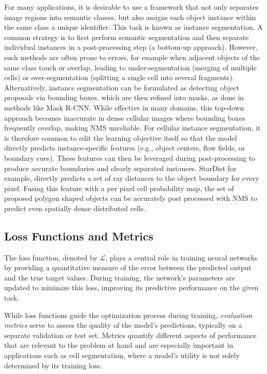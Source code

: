 For many applications, it is desirable to use a framework that not only separates image regions into semantic classes, but also assigns each object instance within the same class a unique identifier. This task is known as instance segmentation.
A common strategy is to first perform semantic segmentation and then separate individual instances in a post-processing step (a bottom-up approach). However, such methods are often prone to errors, for example when adjacent objects of the same class touch or overlap, leading to under-segmentation (merging of multiple cells) or over-segmentation (splitting a single cell into several fragments).
Alternatively, instance segmentation can be formulated as detecting object proposals via bounding boxes, which are then refined into masks, as done in methods like Mask R-CNN. While effective in many domains, this top-down approach becomes inaccurate in dense cellular images where bounding boxes frequently overlap, making NMS unreliable.
For cellular instance segmentation, it is therefore common to edit the learning objective itself so that the model directly predicts instance-specific features (e.g., object centers, flow fields, or boundary cues). These features can then be leveraged during post-processing to produce accurate boundaries and clearly separated instances. StarDist for example, directly predicts a set of ray distances to the object boundary for every pixel. Fusing this feature with a per pixel cell probability map, the set of proposed polygon shaped objects can be accurately post processed with NMS to predict even spatially dense distributed cells.




\subsection{Loss Functions and Metrics}

The loss function, denoted by $\mathcal{L}$, plays a central role in training neural networks by providing a quantitative measure of the error between the predicted output and the true target values. During training, the network's parameters are updated to minimize this loss, improving its predictive performance on the given task.

While loss functions guide the optimization process during training, \textit{evaluation metrics} serve to assess the quality of the model's predictions, typically on a separate validation or test set. Metrics quantify different aspects of performance that are relevant to the problem at hand and are especially important in applications such as cell segmentation, where a model's utility is not solely determined by its training loss.


